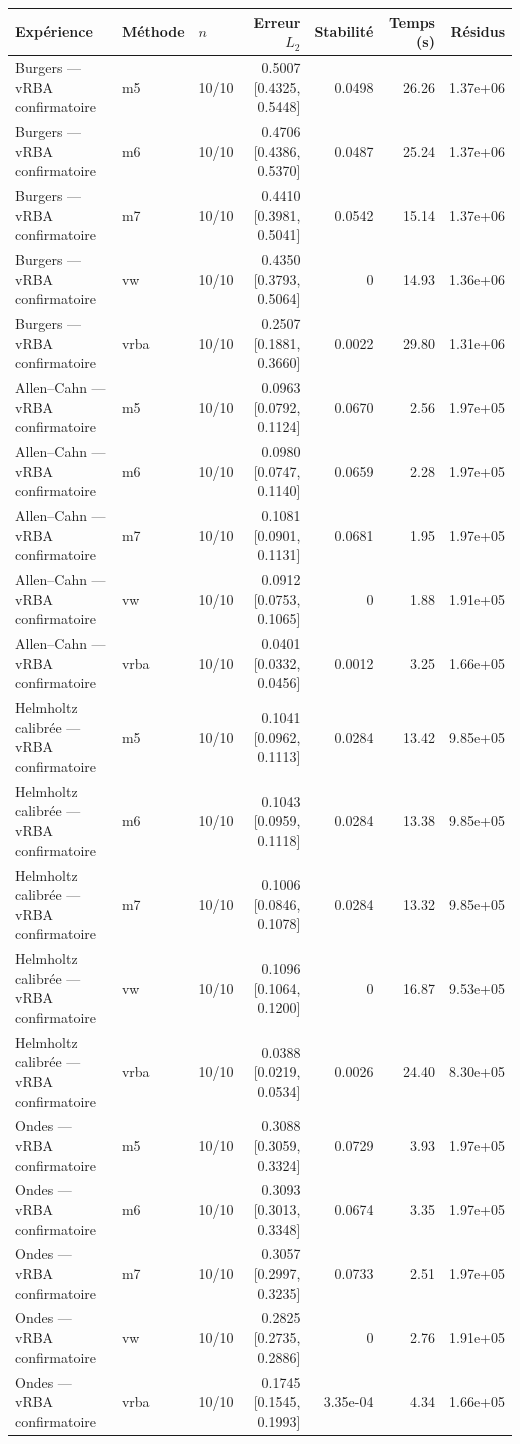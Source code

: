 \begin{tabular}{lllrrrr}
\toprule
Expérience & Méthode & $n$ & Erreur $L_2$ & Stabilité & Temps (s) & Résidus \\
\midrule
Burgers — vRBA confirmatoire & m5 & 10/10 & 0.5007 [0.4325, 0.5448] & 0.0498 & 26.26 & 1.37e+06 \\
Burgers — vRBA confirmatoire & m6 & 10/10 & 0.4706 [0.4386, 0.5370] & 0.0487 & 25.24 & 1.37e+06 \\
Burgers — vRBA confirmatoire & m7 & 10/10 & 0.4410 [0.3981, 0.5041] & 0.0542 & 15.14 & 1.37e+06 \\
Burgers — vRBA confirmatoire & vw & 10/10 & 0.4350 [0.3793, 0.5064] & 0 & 14.93 & 1.36e+06 \\
Burgers — vRBA confirmatoire & vrba & 10/10 & 0.2507 [0.1881, 0.3660] & 0.0022 & 29.80 & 1.31e+06 \\
Allen–Cahn — vRBA confirmatoire & m5 & 10/10 & 0.0963 [0.0792, 0.1124] & 0.0670 & 2.56 & 1.97e+05 \\
Allen–Cahn — vRBA confirmatoire & m6 & 10/10 & 0.0980 [0.0747, 0.1140] & 0.0659 & 2.28 & 1.97e+05 \\
Allen–Cahn — vRBA confirmatoire & m7 & 10/10 & 0.1081 [0.0901, 0.1131] & 0.0681 & 1.95 & 1.97e+05 \\
Allen–Cahn — vRBA confirmatoire & vw & 10/10 & 0.0912 [0.0753, 0.1065] & 0 & 1.88 & 1.91e+05 \\
Allen–Cahn — vRBA confirmatoire & vrba & 10/10 & 0.0401 [0.0332, 0.0456] & 0.0012 & 3.25 & 1.66e+05 \\
Helmholtz calibrée — vRBA confirmatoire & m5 & 10/10 & 0.1041 [0.0962, 0.1113] & 0.0284 & 13.42 & 9.85e+05 \\
Helmholtz calibrée — vRBA confirmatoire & m6 & 10/10 & 0.1043 [0.0959, 0.1118] & 0.0284 & 13.38 & 9.85e+05 \\
Helmholtz calibrée — vRBA confirmatoire & m7 & 10/10 & 0.1006 [0.0846, 0.1078] & 0.0284 & 13.32 & 9.85e+05 \\
Helmholtz calibrée — vRBA confirmatoire & vw & 10/10 & 0.1096 [0.1064, 0.1200] & 0 & 16.87 & 9.53e+05 \\
Helmholtz calibrée — vRBA confirmatoire & vrba & 10/10 & 0.0388 [0.0219, 0.0534] & 0.0026 & 24.40 & 8.30e+05 \\
Ondes — vRBA confirmatoire & m5 & 10/10 & 0.3088 [0.3059, 0.3324] & 0.0729 & 3.93 & 1.97e+05 \\
Ondes — vRBA confirmatoire & m6 & 10/10 & 0.3093 [0.3013, 0.3348] & 0.0674 & 3.35 & 1.97e+05 \\
Ondes — vRBA confirmatoire & m7 & 10/10 & 0.3057 [0.2997, 0.3235] & 0.0733 & 2.51 & 1.97e+05 \\
Ondes — vRBA confirmatoire & vw & 10/10 & 0.2825 [0.2735, 0.2886] & 0 & 2.76 & 1.91e+05 \\
Ondes — vRBA confirmatoire & vrba & 10/10 & 0.1745 [0.1545, 0.1993] & 3.35e-04 & 4.34 & 1.66e+05 \\
\bottomrule
\end{tabular}
